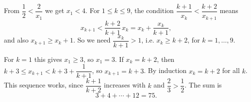 From $\dfrac12<\dfrac2{x_1}$ we get $x_1<4$. For $1\le k\le9$, the condition $\dfrac{k+1}{x_k}<\dfrac{k+2}{x_{k+1}}$ means
\[x_{k+1}<\dfrac{k+2}{k+1}\,x_k=x_k+\dfrac{x_k}{k+1},\]
and also $x_{k+1}\ge x_k+1$. So we need $\dfrac{x_k}{k+1}>1$, i.e. $x_k\ge k+2$, for $k=1,\dots,9$.

For $k=1$ this gives $x_1\ge3$, so $x_1=3$. If $x_k=k+2$, then $k+3\le x_{k+1}<k+3+\dfrac1{k+1}$, so $x_{k+1}=k+3$. By induction $x_k=k+2$ for all $k$. This sequence works, since $\dfrac{k+1}{k+2}$ increases with $k$ and $\dfrac23>\dfrac12$. The sum is
\[3+4+\cdots+12=\boxed{75}.\]
